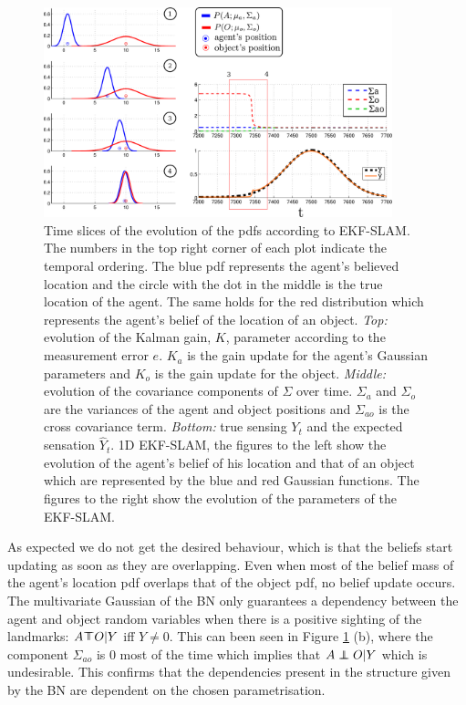 \begin{figure}
\centering
 \includegraphics[width=0.9\textwidth]{./ch5-MLMF/Figures/Figure34.pdf}
\caption{Time slices of the evolution of the pdfs according to EKF-SLAM. The numbers in the top right corner of each plot indicate the temporal ordering.
The blue pdf represents the agent's believed location and the circle with the dot in the middle is the true location of the agent. The same holds 
for the red distribution which represents the agent's belief of the location of an object.
\textit{Top:} evolution of the Kalman gain, $K$, parameter according to the measurement error $e$. $K_a$ is the gain update for the 
agent's Gaussian parameters and $K_o$ is the gain update for the object. \textit{Middle:} evolution of the covariance components of 
$\Sigma$ over time. $\Sigma_a$ and $\Sigma_o$ are the variances of the agent and object positions and $\Sigma_{ao}$ is the cross covariance 
term. \textit{Bottom:} true sensing $Y_t$ and the expected sensation $\hat{Y}_t$.
1D EKF-SLAM, the figures to the left show the evolution of the agent's belief of his location and that of an 
object which are represented by the blue and red Gaussian functions. The figures to the right show the evolution of the parameters of the EKF-SLAM.}
\label{fig:EKF-SLAM}
\end{figure}

As expected we do not get the desired behaviour, which is that the beliefs start updating as soon as they are overlapping. 
Even when most of the belief mass of the agent's 
location pdf overlaps that of the object pdf, no belief update occurs. The multivariate Gaussian of the BN only guarantees a 
dependency between the agent and object random variables when there is a positive sighting of the landmarks:
$A \dependent O | Y$ iff $Y \not= 0$.  This can been seen in Figure \ref{fig:EKF-SLAM} (b), where the component 
$\Sigma_{ao}$ is 0 most of the time which implies that $A \independent O | Y$ which is undesirable. 
This confirms that the dependencies present in the structure given by the BN are dependent on the chosen parametrisation.

